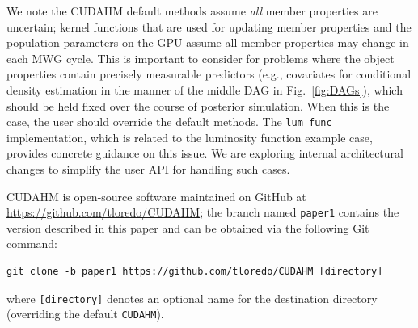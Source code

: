We note the CUDAHM default methods assume \emph{all} member properties are uncertain; kernel functions that are used for updating member properties and the population parameters on the GPU assume all member properties may change in each MWG cycle.
This is important to consider for problems where the object properties contain precisely measurable predictors (e.g., covariates for conditional density estimation in the manner of the middle DAG in Fig.~\ref{fig:DAGs}), which should be held fixed over the course of posterior simulation.
When this is the case, the user should override the default methods.
The \texttt{lum\_func} implementation, which is related to the luminosity function example case, provides concrete guidance on this issue.
We are exploring internal architectural changes to simplify the user API for handling such cases.




CUDAHM is open-source software maintained on GitHub at \url{https://github.com/tloredo/CUDAHM}; the branch named \texttt{paper1} contains the version described in this paper and can be obtained via the following Git command:
\begin{verbatim}
git clone -b paper1 https://github.com/tloredo/CUDAHM [directory]
\end{verbatim}
where \verb|[directory]| denotes an optional name for the destination directory (overriding the default \verb|CUDAHM|).